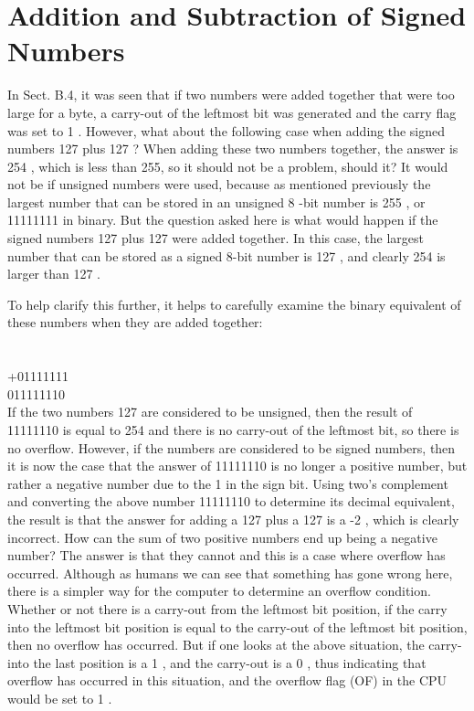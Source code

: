 \documentclass[10pt]{book}
\begin{document}
\section{Addition and Subtraction of Signed Numbers}
In Sect. B.4, it was seen that if two numbers were added together that were too large for a byte, a carry-out of the leftmost bit was generated and the carry flag was set to 1 . However, what about the following case when adding the signed numbers 127 plus 127 ? When adding these two numbers together, the answer is 254 , which is less than 255, so it should not be a problem, should it? It would not be if unsigned numbers were used, because as mentioned previously the largest number that can be stored in an unsigned 8 -bit number is 255 , or 11111111 in binary. But the question asked here is what would happen if the signed numbers 127 plus 127 were added together. In this case, the largest number that can be stored as a signed 8-bit number is 127 , and clearly 254 is larger than 127 .

To help clarify this further, it helps to carefully examine the binary equivalent of these numbers when they are added together:

\section{}
+01111111\\
011111110\\
If the two numbers 127 are considered to be unsigned, then the result of 11111110 is equal to 254 and there is no carry-out of the leftmost bit, so there is no overflow. However, if the numbers are considered to be signed numbers, then it is now the case that the answer of 11111110 is no longer a positive number, but rather a negative number due to the 1 in the sign bit. Using two's complement and converting the above number 11111110 to determine its decimal equivalent, the result is that the answer for adding a 127 plus a 127 is a -2 , which is clearly incorrect. How can the sum of two positive numbers end up being a negative number? The answer is that they cannot and this is a case where overflow has occurred. Although as humans we can see that something has gone wrong here, there is a simpler way for the computer to determine an overflow condition. Whether or not there is a carry-out from the leftmost bit position, if the carry into the leftmost bit position is equal to the carry-out of the leftmost bit position, then no overflow has occurred. But if one looks at the above situation, the carry-into the last position is a 1 , and the carry-out is a 0 , thus indicating that overflow has occurred in this situation, and the overflow flag (OF) in the CPU would be set to 1 .
\end{document}
